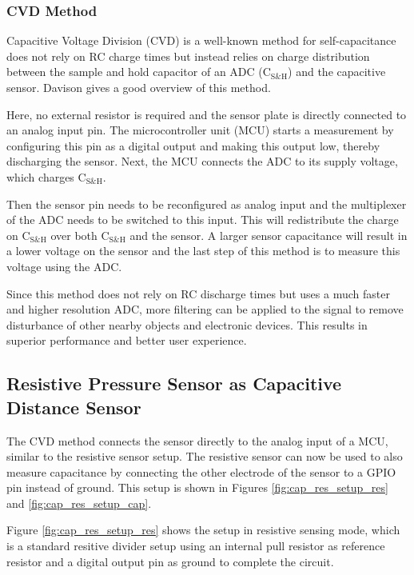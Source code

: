 \documentclass{sigchi-ext}
\begin{document}
\subsubsection{CVD Method}
Capacitive Voltage Division (CVD) is a well-known method for self-capacitance does not rely on RC charge times
but instead relies on charge distribution between the sample and hold capacitor
of an ADC ($\textrm{C}_{\textrm{S\&H}}$) and the capacitive sensor. Davison \cite{Davison2013a} gives a
good overview of this method.

Here, no external resistor is required and the sensor plate is
directly connected to an analog input pin. The microcontroller unit (MCU) starts a
measurement by configuring this pin as a digital output and making this output low,
thereby discharging the sensor. Next, the MCU connects the 
ADC to its supply voltage, which charges $\textrm{C}_{\textrm{S\&H}}$.

Then the sensor pin needs to be reconfigured as analog input and the
multiplexer of the ADC needs to be switched to this input. This will
redistribute the charge on $\textrm{C}_{\textrm{S\&H}}$ over both
$\textrm{C}_{\textrm{S\&H}}$ and the sensor. A larger sensor
capacitance will result in a lower voltage on the sensor and the last step of
this method is to measure this voltage using the ADC.

Since this method does not rely on RC discharge times but uses 
a much faster and higher resolution ADC, more filtering can be applied to the signal to remove
disturbance of other nearby objects and electronic devices. This results in
superior performance and better user experience.

\subsection{Resistive Pressure Sensor as Capacitive Distance Sensor}
The CVD method connects the sensor directly to the analog input of a
MCU, similar to the resistive sensor setup. The resistive sensor can
now be used to also measure capacitance by connecting the other electrode of the
sensor to a GPIO pin instead of ground. This setup is shown in Figures
\ref{fig:cap_res_setup_res} and \ref{fig:cap_res_setup_cap}.

Figure \ref{fig:cap_res_setup_res} shows the setup in resistive sensing mode,
which is a standard resitive divider setup using an internal pull resistor
as reference resistor and a digital output pin as ground to complete the
circuit.
\end{document}
